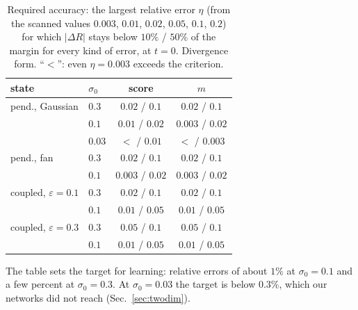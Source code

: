 \begin{table}[t]
\caption{Required accuracy: the largest relative error $\eta$ (from the scanned values $0.003$, $0.01$, $0.02$, $0.05$, $0.1$, $0.2$) for which $|\Delta R|$ stays below $10\%$ / $50\%$ of the margin for every kind of error, at $t = 0$. Divergence form. ``$<$'': even $\eta = 0.003$ exceeds the criterion.}
\label{tab:required}
\begin{ruledtabular}
\begin{tabular}{llcc}
state & $\sigma_0$ & score & $m$ \\
\hline
pend., Gaussian & $0.3$ & $0.02$ / $0.1$ & $0.02$ / $0.1$ \\
 & $0.1$ & $0.01$ / $0.02$ & $0.003$ / $0.02$ \\
 & $0.03$ & $<$ / $0.01$ & $<$ / $0.003$ \\
pend., fan & $0.3$ & $0.02$ / $0.1$ & $0.02$ / $0.1$ \\
 & $0.1$ & $0.003$ / $0.02$ & $0.003$ / $0.02$ \\
coupled, $\varepsilon\!=\!0.1$ & $0.3$ & $0.02$ / $0.1$ & $0.02$ / $0.1$ \\
 & $0.1$ & $0.01$ / $0.05$ & $0.01$ / $0.05$ \\
coupled, $\varepsilon\!=\!0.3$ & $0.3$ & $0.05$ / $0.1$ & $0.05$ / $0.1$ \\
 & $0.1$ & $0.01$ / $0.05$ & $0.01$ / $0.05$ \\
\end{tabular}
\end{ruledtabular}
\end{table}

The table sets the target for learning: relative errors of about $1\%$ at $\sigma_0 = 0.1$ and a few percent at $\sigma_0 = 0.3$. At $\sigma_0 = 0.03$ the target is below $0.3\%$, which our networks did not reach (Sec.~\ref{sec:twodim}).
